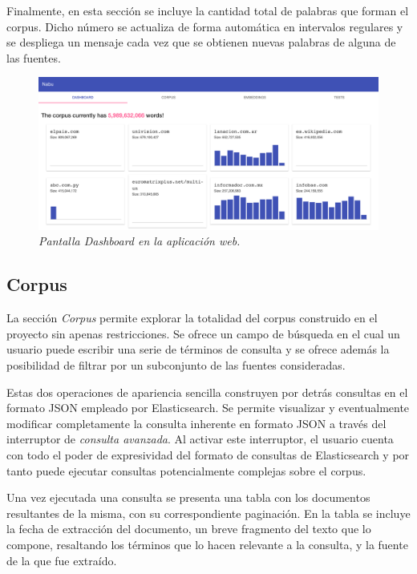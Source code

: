 Finalmente, en esta sección se incluye la cantidad total de palabras que forman el corpus. Dicho número se
actualiza de forma automática en intervalos regulares y se despliega un mensaje cada vez que se obtienen
nuevas palabras de alguna de las fuentes.

\begin{figure}[h]
    \centering
    \includegraphics[width=\textwidth]{images/ui-nabu-dashboard}
    \caption{\textit{Pantalla Dashboard en la aplicación web.}}
    \label{fig:ui-nabu-dashboard}
\end{figure}

\subsection{Corpus}

La sección \textit{Corpus} permite explorar la totalidad del corpus construido en el proyecto sin apenas
restricciones. Se ofrece un campo de búsqueda en el cual un usuario puede escribir una serie de términos
de consulta y se ofrece además la posibilidad de filtrar por un subconjunto de las fuentes consideradas.

Estas dos operaciones de apariencia sencilla construyen por detrás consultas en el formato JSON empleado
por Elasticsearch. Se permite visualizar y eventualmente modificar completamente la consulta inherente en
formato JSON a través del interruptor de \textit{consulta avanzada}. Al activar este interruptor, el
usuario cuenta con todo el poder de expresividad del formato de consultas de Elasticsearch y por tanto
puede ejecutar consultas potencialmente complejas sobre el corpus.

Una vez ejecutada una consulta se presenta una tabla con los documentos resultantes de la misma, con su
correspondiente paginación. En la tabla se incluye la fecha de extracción del documento, un breve fragmento
del texto que lo compone, resaltando los términos que lo hacen relevante a la consulta, y la fuente de la
que fue extraído.

